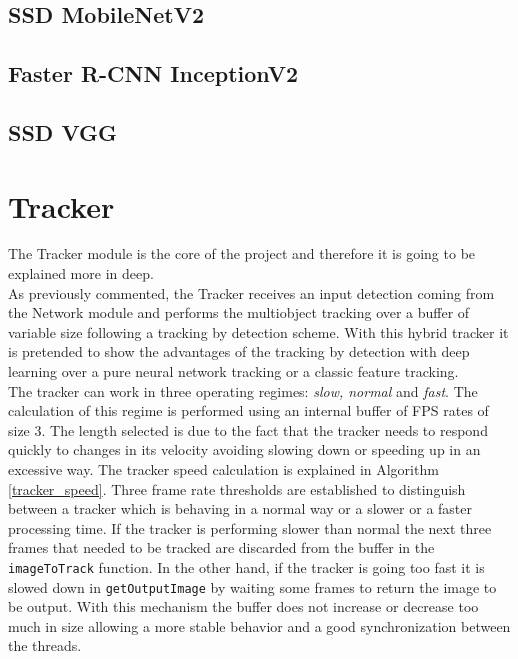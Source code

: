 \subsection{SSD MobileNetV2}
\subsection{Faster R-CNN InceptionV2}
\subsection{SSD VGG}

\section{Tracker}
The Tracker module is the core of the project and therefore it is going to be explained more in deep.\\
As previously commented, the Tracker receives an input detection coming from the Network module and performs the multiobject tracking over a buffer of variable size following a tracking by detection scheme. With this hybrid tracker it is pretended to show the advantages of the tracking by detection with deep learning over a pure neural network tracking or a classic feature tracking.\\
The tracker can work in three operating regimes: \textit{slow, normal} and \textit{fast}. The calculation of this regime is performed using an internal buffer of FPS rates of size 3. The length selected is due to the fact that the tracker needs to respond quickly to changes in its velocity avoiding slowing down or speeding up in an excessive way. The tracker speed calculation is explained in Algorithm \ref{tracker_speed}. Three frame rate thresholds are established to distinguish between a tracker which is behaving in a normal way or a slower or a faster processing time. If the tracker is performing slower than normal the next three frames that needed to be tracked are discarded from the buffer in the \texttt{imageToTrack} function. In the other hand, if the tracker is going too fast it is slowed down in \texttt{getOutputImage} by waiting some frames to return the image to be output. With this mechanism the buffer does not increase or decrease too much in size allowing a more stable behavior and a good synchronization between the threads.

